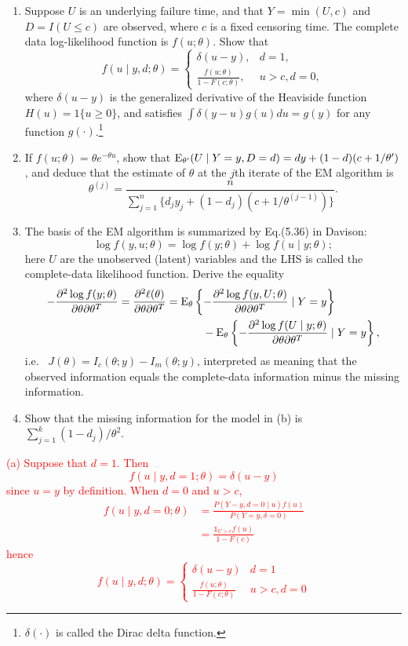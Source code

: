 \documentclass[12pt]{article}
\def\E{{\rm E}}
\newcommand{\1}{\mathds 1}
\begin{document}
\begin{enumerate}
\begin{enumerate}
	\item Suppose $U$ is an underlying failure time, and that $Y=\min(U, c)$ and $D = I(U\le c)$ are observed, where $c$ is a fixed censoring time. The complete data log-likelihood function is $f(u;\theta)$. Show that $$f(u\mid y,d;\theta) = \begin{cases} \delta(u-y),&d=1, \\ \frac{f(u;\theta)}{1-F(c;\theta)}, & u>c, d=0, \end{cases}$$ where $\delta(u-y)$ is  the generalized derivative of the Heaviside function $H(u) = 1\{u\ge 0\}$, and satisfies $\int \delta(y-u)g(u)du = g(y)$ for any function $g(\cdot)$.\footnote{$\delta(\cdot)$ is called the Dirac delta function.}
	\item If $f(u;\theta) = \theta e^{-\theta u}$, show that $\E_{\theta'}(U\mid Y=y, D=d) = dy +(1-d)(c+1/\theta')$, and deduce that the estimate of $\theta$ at the $j$th iterate of the EM algorithm is $$\theta^{(j)} = \frac{n}{\sum_{j=1}^n\{d_jy_j + (1-d_j)(c+1/\theta^{ (j-1)})\}}.$$
	\item The basis of the EM algorithm is summarized by Eq.(5.36) in Davison: $$\log f(y,u;\theta) = \log f(y;\theta) + \log f(u\mid y;\theta);$$ here $U$ are the unobserved (latent) variables and the LHS is called the complete-data likelihood function.   Derive the equality 
    \begin{align*}
         -\frac{\partial^2\log f(y;\theta)}{\partial\theta\partial\theta^T} = \frac{\partial^2\ell(\theta)}{\partial\theta\partial\theta^T} &= \E_\theta\left\{-\frac{\partial^2\log f(y,U;\theta)}{\partial\theta\partial\theta^T}\mid Y=y \right\} \\ 
	    & ~~~~~~~~~~-\E_\theta\left\{-\frac{\partial^2\log f(U\mid y;\theta)}{\partial\theta\partial\theta^T}\mid Y=y\right\},
	\end{align*}
	i.e.~ $J(\theta) = I_c(\theta;y) - I_m(\theta;y)$, interpreted as meaning that the observed information equals the complete-data information minus the missing information.
	\item Show that the missing information for the model in (b) is $\sum_{j=1}^k(1-d_j)/\theta^2$. 
\end{enumerate}
\textcolor{red}{
(a) Suppose that $d = 1$. Then 
\begin{equation*}
	f(u \mid y, d = 1 ; \theta) = \delta(u-y)
\end{equation*}
since $u = y$ by definition. When $d = 0$ and $u > c$, 
\begin{align*}
	f(u \mid y, d = 0 ; \theta) &= \frac{P(Y - y, d = 0 \mid u)f(u)}{P(Y = y, \delta = 0)} \\
	&= \frac{\1_{U >c} f(u)}{1 - F(c)}
\end{align*}
hence 
\begin{equation*}
	f(u \mid y, d ; \theta) = \begin{cases}
		\delta(u - y) & d = 1\\
		\frac{f(u ; \theta)}{1 - F(c ; \theta)} & u > c , d = 0
	\end{cases}
\end{equation*}
}


\end{enumerate}
\end{document}
